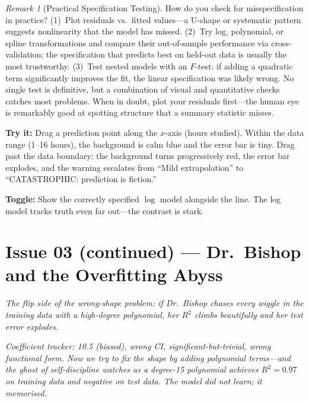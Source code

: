 \documentclass[11pt,a4paper]{article}
\theoremstyle{definition}
\theoremstyle{plain}
\theoremstyle{remark}
\newtheorem{remark}{Remark}[section]
\begin{document}
\begin{remark}[Practical Specification Testing]
How do you check for misspecification in practice? (1)~Plot residuals vs.\ fitted values---a U-shape or systematic pattern suggests nonlinearity that the model has missed. (2)~Try log, polynomial, or spline transformations and compare their out-of-sample performance via cross-validation; the specification that predicts best on held-out data is usually the most trustworthy. (3)~Test nested models with an $F$-test: if adding a quadratic term significantly improves the fit, the linear specification was likely wrong. No single test is definitive, but a combination of visual and quantitative checks catches most problems. When in doubt, plot your residuals first---the human eye is remarkably good at spotting structure that a summary statistic misses.
\end{remark}

\begin{vizspec}[title={``The Comfort Zone'' --- Extrapolation Explorer}]
\textbf{Try it:} Drag a prediction point along the $x$-axis (hours studied). Within the data range (1--16 hours), the background is calm blue and the error bar is tiny. Drag past the data boundary: the background turns progressively red, the error bar explodes, and the warning escalates from ``Mild extrapolation'' to ``CATASTROPHIC: prediction is fiction.''

\textbf{Toggle:} Show the correctly specified $\log$ model alongside the line. The log model tracks truth even far out---the contrast is stark.
\end{vizspec}

\section{Issue 03 (continued) --- Dr.\ Bishop and the Overfitting Abyss}\label{sec:overfitting}

\noindent\emph{The flip side of the wrong-shape problem: if Dr.\ Bishop chases every wiggle in the training data with a high-degree polynomial, her $R^2$ climbs beautifully and her test error explodes.}

\noindent\textit{Coefficient tracker: 10.5 (biased), wrong CI, significant-but-trivial, wrong functional form. Now we try to fix the shape by adding polynomial terms---and the ghost of self-discipline watches as a degree-15 polynomial achieves $R^2 = 0.97$ on training data and negative on test data. The model did not learn; it memorised.}
\end{document}
